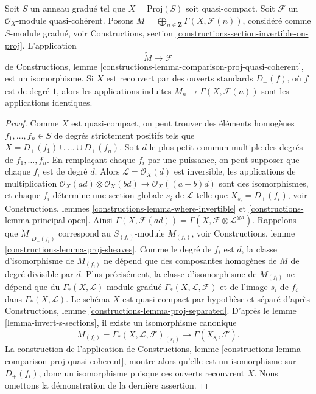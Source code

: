 \begin{lemma}
\label{lemma-proj-quasi-coherent}
Soit $S$ un anneau gradué tel que $X = \text{Proj}(S)$ soit quasi-compact.
Soit $\mathcal{F}$ un $\mathcal{O}_X$-module quasi-cohérent. Posons
$M = \bigoplus_{n \in \mathbf{Z}} \Gamma(X, \mathcal{F}(n))$,
considéré comme $S$-module gradué, voir
Constructions, section \ref{constructions-section-invertible-on-proj}.
L'application
$$
\widetilde{M} \longrightarrow \mathcal{F}
$$
de Constructions, lemme
\ref{constructions-lemma-comparison-proj-quasi-coherent},
est un isomorphisme.
Si $X$ est recouvert par des ouverts standards $D_+(f)$, où $f$ est de degré $1$,
alors les applications induites
$M_n \to \Gamma(X, \mathcal{F}(n))$ sont les applications identiques.
\end{lemma}

\begin{proof}
Comme $X$ est quasi-compact, on peut trouver des éléments homogènes
$f_1, \ldots, f_n \in S$ de degrés strictement positifs tels que
$X = D_+(f_1) \cup \ldots \cup D_+(f_n)$. Soit $d$ le
plus petit commun multiple des degrés de $f_1, \ldots, f_n$.
En remplaçant chaque $f_i$ par une puissance, on peut supposer que chaque
$f_i$ est de degré $d$. Alors $\mathcal{L} = \mathcal{O}_X(d)$ est
inversible, les applications de multiplication
$\mathcal{O}_X(ad) \otimes \mathcal{O}_X(bd) \to \mathcal{O}_X((a + b)d)$
sont des isomorphismes, et chaque $f_i$ détermine une section globale $s_i$
de $\mathcal{L}$ telle que $X_{s_i} = D_+(f_i)$, voir
Constructions, lemmes \ref{constructions-lemma-where-invertible} et
\ref{constructions-lemma-principal-open}.
Ainsi $\Gamma(X, \mathcal{F}(ad)) =
\Gamma(X, \mathcal{F} \otimes \mathcal{L}^{\otimes a})$.
Rappelons que $\widetilde{M}|_{D_{+}(f_i)}$ correspond au
$S_{(f_i)}$-module $M_{(f_i)}$, voir
Constructions, lemme \ref{constructions-lemma-proj-sheaves}.
Comme le degré de $f_i$ est $d$, la classe d'isomorphisme de
$M_{(f_i)}$ ne dépend que des composantes homogènes de $M$ de
degré divisible par $d$. Plus précisément, la classe d'isomorphisme de
$M_{(f_i)}$ ne dépend que du $\Gamma_*(X, \mathcal{L})$-module gradué
$\Gamma_*(X, \mathcal{L}, \mathcal{F})$
et de l'image $s_i$ de $f_i$ dans $\Gamma_*(X, \mathcal{L})$.
Le schéma $X$ est quasi-compact par hypothèse et
séparé d'après Constructions, lemme \ref{constructions-lemma-proj-separated}.
D'après le lemme \ref{lemma-invert-s-sections}, il existe un isomorphisme canonique
$$
M_{(f_i)} = \Gamma_*(X, \mathcal{L}, \mathcal{F})_{(s_i)} \to
\Gamma(X_{s_i}, \mathcal{F}).
$$
La construction de l'application de Constructions, lemme
\ref{constructions-lemma-comparison-proj-quasi-coherent},
montre alors qu'elle est un isomorphisme sur $D_+(f_i)$,
donc un isomorphisme puisque ces ouverts recouvrent $X$.
Nous omettons la démonstration de la dernière assertion.
\end{proof}


